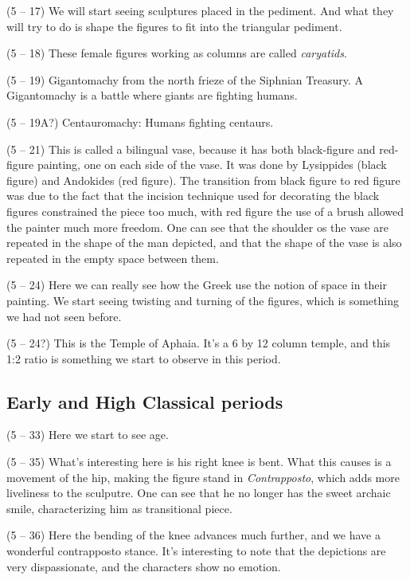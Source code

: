 \documentclass{article}
\begin{document}
    \begin{spacing}{1.2}
    \newpage
        (5 -- 17) We will start seeing sculptures placed in the pediment. And what they will try to do is shape the figures to fit into the triangular pediment.

        (5 -- 18) These female figures working as columns are called \emph{caryatids}.

        (5 -- 19) Gigantomachy from the north frieze of the Siphnian Treasury. A Gigantomachy is a battle where giants are fighting humans.

        (5 -- 19A?) Centauromachy: Humans fighting centaurs.

        (5 -- 21) This is called a bilingual vase, because it has both black-figure and red-figure painting, one on each side of the vase. It was done by Lysippides (black figure) and Andokides (red figure). The transition from black figure to red figure was due to the fact that the incision technique used for decorating the black figures constrained the piece too much, with red figure the use of a brush allowed the painter much more freedom. One can see that the shoulder os the vase are repeated in the shape of the man depicted, and that the shape of the vase is also repeated in the empty space between them.
        
        (5 -- 24) Here we can really see how the Greek use the notion of space in their painting. We start seeing twisting and turning of the figures, which is something we had not seen before.

        (5 -- 24?) This is the Temple of Aphaia. It's a 6 by 12 column temple, and this 1:2 ratio is something we start to observe in this period.

        \subsection{Early and High Classical periods}

        (5 -- 33) Here we start to see age.

        (5 -- 35) What's interesting here is his right knee is bent. What this causes is a movement of the hip, making the figure stand in \emph{Contrapposto}, which adds more liveliness to the sculputre. One can see that he no longer has the sweet archaic smile, characterizing him as transitional piece. 

        (5 -- 36) Here the bending of the knee advances much further, and we have a wonderful contrapposto stance. It's interesting to note that the depictions are very dispassionate, and the characters show no emotion.


\end{spacing}
\end{document}

